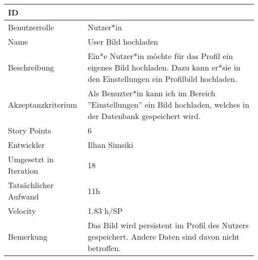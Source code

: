 \begin{tabularx}{\textwidth}{|p{}|X|}
	\hline
	ID & \\
	\hline
	Benutzerrolle & Nutzer*in\\
	\hline
	Name & User Bild hochladen\\
	\hline
	Beschreibung & Ein*e Nutzer*in möchte für das Profil ein eigenes Bild hochladen. Dazu kann er*sie in den Einstellungen ein Profilbild hochladen.\\
	\hline
	Akzeptanzkriterium & Als Benuzter*in kann ich im Bereich ''Einstellungen'' ein Bild hochladen, welches in der Datenbank gespeichert wird.\\
	\hline
	Story Points & 6\\
	\hline
	Entwickler & Ilhan Simsiki\\
	\hline
	Umgesetzt in Iteration & 18\\
	\hline
	Tatsächlicher Aufwand & 11h\\
	\hline
	Velocity & 1.83 h/SP\\
	\hline
	Bemerkung & Das Bild wird persistent im Profil des Nutzers gespeichert. Andere Daten sind davon nicht betroffen.\\
	\hline
\end{tabularx}
\vspace{20pt}
